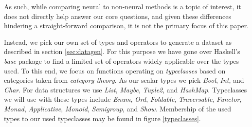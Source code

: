 \documentclass{article}
\begin{document}



As such, while comparing neural to non-neural methods is a topic of interest,
it does not directly help answer our core questions,
and given
these differences hindering a straight-forward comparison,
it is not the primary focus of this paper.

Instead, we pick our own set of types and operators to generate a dataset as described in section \ref{sec:datagen}.
For this purpose we have gone over Haskell's \emph{base} package to find a limited set of operators widely applicable over the types used.
To this end, we focus on functions operating on \emph{typeclasses} based on categories taken from \emph{category theory}.
As our scalar types we pick \emph{Bool}, \emph{Int}, and \emph{Char}.
For data structures we use \emph{List}, \emph{Maybe}, \emph{Tuple2}, and \emph{HashMap}.
Typeclasses we will use with these types include \emph{Enum}, \emph{Ord}, \emph{Foldable}, \emph{Traversable}, \emph{Functor}, \emph{Monad}, \emph{Applicative},
\emph{Monoid}, \emph{Semigroup}, and \emph{Show}.
Membership of the used types to our used typeclasses may be found in figure \ref{typeclasses}.
\end{document}
